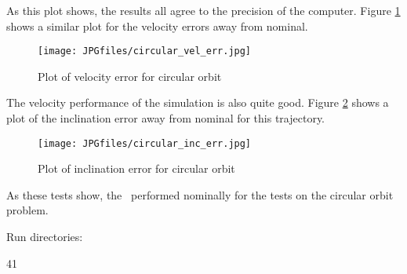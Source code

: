 \begin{description}
As this plot shows, the results all agree to the precision of the computer.
Figure \ref{circ_traj_vel_err} shows a similar plot for the velocity errors
away from nominal.

\begin{figure}[h]
\begin{center}
\texttt{[image: JPGfiles/circular\_vel\_err.jpg]}
\caption{Plot of velocity error for circular orbit}
\label{circ_traj_vel_err}
\end{center}
\end{figure}

The velocity performance of the simulation is also quite good.  Figure
\ref{circ_traj_inc_err} shows a plot of the inclination error away from nominal
for this trajectory.

\begin{figure}[h]
\begin{center}
\texttt{[image: JPGfiles/circular\_inc\_err.jpg]}
\caption{Plot of inclination error for circular orbit}
\label{circ_traj_inc_err}
\end{center}
\end{figure}

As these tests show, the \OrbitalElement\ performed nominally for the
tests on the circular orbit problem.

Run directories:

41
\end{description}

